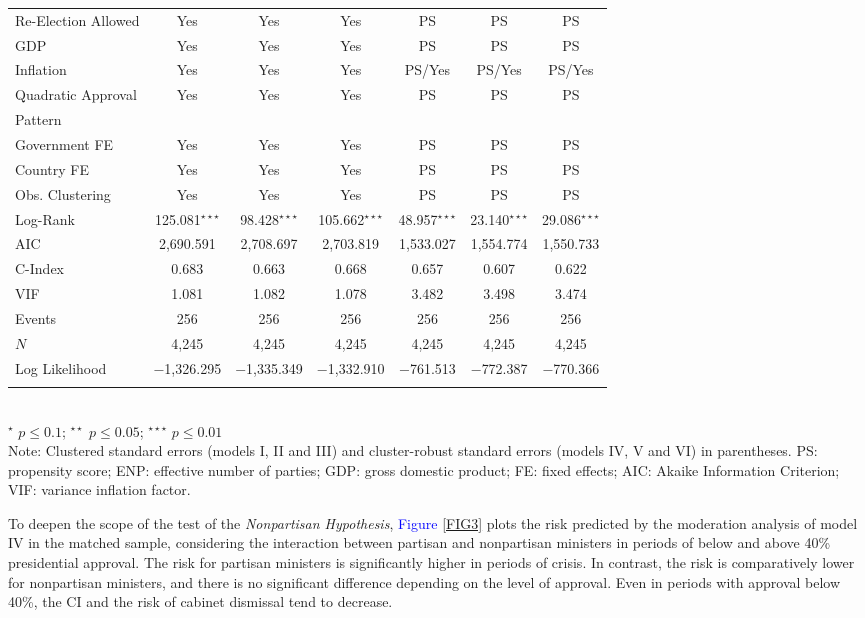 \documentclass[12pt,halfline,a4paper]{ouparticle}
\begin{document}
\begin{table}[!htbp]
{\begin{tabular}{@{\extracolsep{5pt}}lcccccc}
Re-Election Allowed & Yes & Yes & Yes & PS & PS & PS \\ 
GDP & Yes & Yes & Yes & PS & PS & PS \\ 
Inflation & Yes & Yes & Yes & PS/Yes & PS/Yes & PS/Yes \\ 
Quadratic Approval & \multirow{2}{*}{Yes} & \multirow{2}{*}{Yes} & \multirow{2}{*}{Yes} & \multirow{2}{*}{PS} & \multirow{2}{*}{PS} & \multirow{2}{*}{PS} \\ 
Pattern & & & & & & \\ 
Government FE & Yes & Yes & Yes & PS & PS & PS \\ 
Country FE & Yes & Yes & Yes & PS & PS & PS \\ 
Obs. Clustering & Yes & Yes & Yes & PS & PS & PS \\ \midrule
Log-Rank & 125.081$^{\star\star\star}$ & 98.428$^{\star\star\star}$ & 105.662$^{\star\star\star}$ & 48.957$^{\star\star\star}$ & 23.140$^{\star\star\star}$ & 29.086$^{\star\star\star}$ \\ 
AIC & 2,690.591 & 2,708.697 & 2,703.819 & 1,533.027 & 1,554.774 & 1,550.733 \\ 
C-Index & 0.683 & 0.663 & 0.668 & 0.657 & 0.607 & 0.622 \\ 
VIF & 1.081 & 1.082 & 1.078 & 3.482 & 3.498 & 3.474 \\ \midrule
Events & 256 & 256 & 256 & 256 & 256 & 256 \\ 
$N$ & 4,245 & 4,245 & 4,245 & 4,245 & 4,245 & 4,245 \\ 
Log Likelihood & $-$1,326.295 & $-$1,335.349 & $-$1,332.910 & $-$761.513 & $-$772.387 & $-$770.366 \\ 
\bottomrule\\[-1.8ex] 
\end{tabular} 
} \\
{\footnotesize $^{\star}$ $p \leq 0.1$; $^{\star\star}$ $p \leq 0.05$; $^{\star\star\star}$ $p \leq 0.01$ \\
Note: Clustered standard errors (models I, II and III) and cluster-robust standard errors (models IV, V and VI) in parentheses. PS: propensity score; ENP: effective number of parties; GDP: gross domestic product; FE: fixed effects; AIC: Akaike Information Criterion; VIF: variance inflation factor.} 
\end{table} 

To deepen the scope of the test of the {\itshape Nonpartisan Hypothesis}, \textcolor{blue}{Figure} \ref{FIG3} plots the risk predicted by the moderation analysis of model IV in the matched sample, considering the interaction between partisan and nonpartisan ministers in periods of below and above 40\% presidential approval. The risk for partisan ministers is significantly higher in periods of crisis. In contrast, the risk is comparatively lower for nonpartisan ministers, and there is no significant difference depending on the level of approval. Even in periods with approval below 40\%, the CI and the risk of cabinet dismissal tend to decrease.
\end{document}
